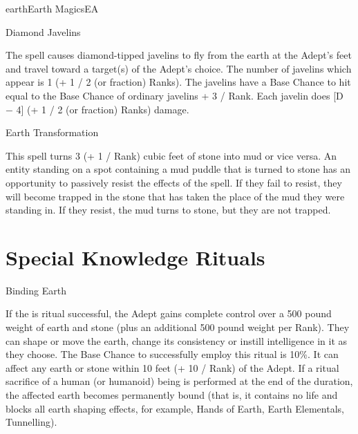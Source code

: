 \begin{College}[1.2]{earth}{Earth Magics}{EA}
\begin{spell}[S-18]{Diamond Javelins}

\begin{effects}
The spell causes diamond-tipped javelins to fly from the earth at the
Adept’s feet and travel toward a target(s) of the Adept’s choice. The
number of javelins which appear is 1 (+ 1 / 2 (or fraction) Ranks).
The javelins have a Base Chance to hit equal to the Base Chance of
ordinary javelins + 3 / Rank.  Each javelin does [D − 4] (+ 1 / 2 (or
fraction) Ranks) damage.
\end{effects}
\end{spell}

\begin{spell}[S-19]{Earth Transformation}

\begin{effects}
This spell turns 3 (+ 1 / Rank) cubic feet of stone into mud or vice
versa. An entity standing on a spot containing a mud puddle that is
turned to stone has an opportunity to passively resist the effects of
the spell.  If they fail to resist, they will become trapped in the
stone that has taken the place of the mud they were standing in.  If
they resist, the mud turns to stone, but they are not trapped.
\end{effects}
\end{spell}

\section{Special Knowledge Rituals}


\begin{ritual}[R-1]{Binding Earth}

\begin{effects}
If the is ritual successful, the Adept gains complete control over a
500 pound weight of earth and stone (plus an additional 500 pound
weight per Rank).  They can shape or move the earth, change its
consistency or instill intelligence in it as they choose.  The Base
Chance to successfully employ this ritual is 10\%.  It can affect any
earth or stone within 10 feet (+ 10 / Rank) of the Adept. If a ritual
sacrifice of a human (or humanoid) being is performed at the end of
the duration, the affected earth becomes permanently bound (that is,
it contains no life and blocks all earth shaping effects, for example,
Hands of Earth, Earth Elementals, Tunnelling).
\end{effects}
\end{ritual}

\end{College}
